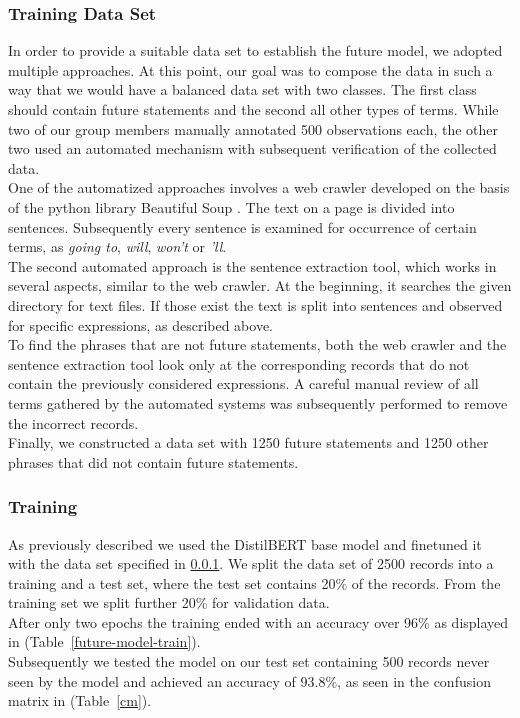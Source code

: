 \subsubsection{Training Data Set}
\label{training}
In order to provide a suitable data set to establish the future model, we adopted multiple approaches.
At this point, our goal was to compose the data in such a way that we would have a balanced data set with two classes.
The first class should contain future statements and the second all other types of terms.
While two of our group members manually annotated 500 observations each, the other two used an automated mechanism with subsequent verification of the collected data.
\\
One of the automatized approaches involves a web crawler developed on the basis of the python library Beautiful Soup \citep{Richardson2022}.
The text on a page is divided into sentences.
Subsequently every sentence is examined for occurrence of certain terms, as \emph{going to}, \emph{will}, \emph{won't} or \emph{'ll}.
\\
The second automated approach is the sentence extraction tool, which works in several aspects, similar to the web crawler.
At the beginning, it searches the given directory for text files.
If those exist the text is split into sentences and observed for specific expressions, as described above.
\\
To find the phrases that are not future statements, both the web crawler and the sentence extraction tool look only at the corresponding records that do not contain the previously considered expressions.
A careful manual review of all terms gathered by the automated systems was subsequently performed to remove the incorrect records.
\\
Finally, we constructed a data set with 1250 future statements and 1250 other phrases that did not contain future statements.

\subsubsection{Training}
As previously described we used the DistilBERT base model and finetuned it with the data set specified in \ref{training}.
We split the data set of 2500 records into a training and a test set, where the test set contains 20\% of the records.
From the training set we split further 20\% for validation data.
\\
After only two epochs the training ended with an accuracy over 96\% as displayed in (Table~\ref{future-model-train}).
\\
Subsequently we tested the model on our test set containing 500 records never seen by the model and achieved an accuracy of 93.8\%, as seen in the confusion matrix in (Table~\ref{cm}).


